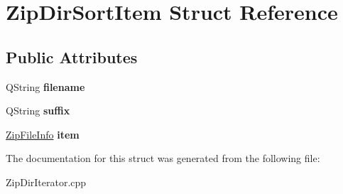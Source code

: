 \hypertarget{struct_zip_dir_sort_item}{}\section{Zip\+Dir\+Sort\+Item Struct Reference}
\label{struct_zip_dir_sort_item}
\subsection*{Public Attributes}
\begin{DoxyCompactItemize}
\item 
Q\+String {\bfseries filename}\hypertarget{struct_zip_dir_sort_item_a689b203883cfb7154932adc5569a5419}{}\label{struct_zip_dir_sort_item_a689b203883cfb7154932adc5569a5419}

\item 
Q\+String {\bfseries suffix}\hypertarget{struct_zip_dir_sort_item_a34111f60bfab1b23d67754f45fc1aabc}{}\label{struct_zip_dir_sort_item_a34111f60bfab1b23d67754f45fc1aabc}

\item 
\hyperlink{class_zip_file_info}{Zip\+File\+Info} {\bfseries item}\hypertarget{struct_zip_dir_sort_item_a55cd8702162300b70504c08c53255745}{}\label{struct_zip_dir_sort_item_a55cd8702162300b70504c08c53255745}

\end{DoxyCompactItemize}


The documentation for this struct was generated from the following file\+:\begin{DoxyCompactItemize}
\item 
Zip\+Dir\+Iterator.\+cpp\end{DoxyCompactItemize}
